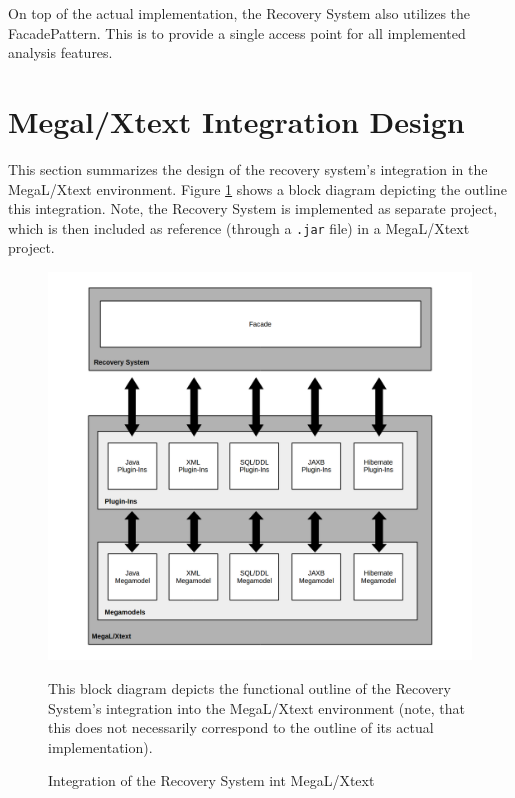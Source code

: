 On top of the actual implementation, the Recovery System also utilizes the \gls{FacadePattern}.
This is to provide a single access point for all implemented analysis features.

\section{Megal/Xtext Integration Design}
\label{section:MegalXtextIntegrationDesign}
This section summarizes the design of the recovery system's integration in the \gls{MegaL/Xtext} environment.
Figure \ref{figure:MegalXtextIntegrationDesign} shows a block diagram depicting the outline this integration.
Note, the Recovery System is implemented as separate project, which is then included as reference (through a \texttt{.jar} file) in a \gls{MegaL/Xtext} project.

\begin{figure}[h!]
\begin{center}
\includegraphics[width=\textwidth]{images/MegalXtextIntegrationDesign.png}
\end{center}
{
\scriptsize
This block diagram depicts the functional outline of the Recovery System's integration into the \gls{MegaL/Xtext} environment (note, that this does not necessarily correspond to the outline of its actual implementation).
}
\caption{Integration of the Recovery System int MegaL/Xtext}
\label{figure:MegalXtextIntegrationDesign}
\end{figure}

